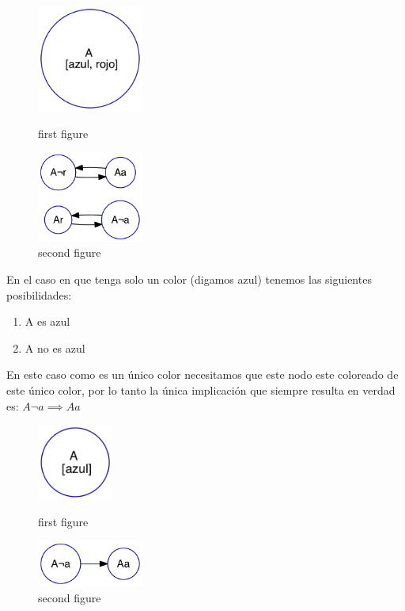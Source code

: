 \documentclass{article}
\theoremstyle{definition}
\theoremstyle{remark}
\begin{document}
\begin{figure}
\centering
\begin{minipage}{0.45\textwidth}
\centering
\includegraphics[width=3.5cm]{graphs/ej1/ej1_intro_2c.png}
\caption{first figure}
\end{minipage}\hfill
\begin{minipage}{0.45\textwidth}
\centering
\includegraphics[width=3.5cm]{graphs/ej1/ej1_intro_2c_impl.png}
\caption{second figure}
\end{minipage}
\end{figure}


En el caso en que tenga solo un color (digamos azul) tenemos las siguientes posibilidades:
\begin{enumerate}
\item A es azul
\item A no es azul
\end{enumerate}
En este caso como es un único color necesitamos que este nodo este coloreado de este único color, por lo tanto la única implicación que siempre resulta en verdad es: $A\neg a \implies Aa$

\begin{figure}
\centering
\begin{minipage}{0.45\textwidth}
\centering
\includegraphics[width=2.5cm]{graphs/ej1/ej1_intro_1c.png}
\caption{first figure}
\end{minipage}\hfill
\begin{minipage}{0.45\textwidth}
\centering
\includegraphics[width=3.5cm]{graphs/ej1/ej1_intro_1c_impl.png}
\caption{second figure}
\end{minipage}
\end{figure}
\end{document}
